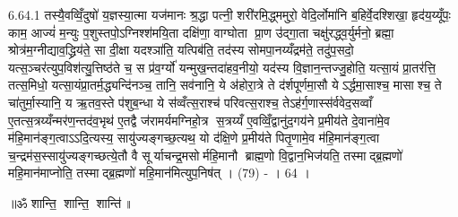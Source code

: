6.64.1
तस्यै॒वव्विँ॒दुषो॑ य॒ज्ञस्या॒त्मा यज॑मानः श्र॒द्धा पत्नी॒ शरी॑रमि॒द्ध्ममुरो॒ वेदि॒र्लोमा॑नि ब॒\ar{}हिर्वे॒दश्शिखा॒ हृद॑य॒य्यूँपः॒ काम॒ आज्यं॑ म॒न्युः प॒शुस्तपो॒ऽग्निश्श॑मयि॒ता दक्षि॑णा॒ वाग्घोता प्रा॒ण उ॑द्गा॒ता चक्षु॑रद्ध्व॒र्युर्मनो॒ ब्रह्मा॒ श्रोत्र॑म॒ग्नीद्याव॒द्ध्रिय॑ते॒ सा दी॒क्षा यदश्ञा॑ति॒ यत्पिब॑ति॒ तद॑स्य सोमपा॒नय्यँद्रम॑ते॒ तदु॑प॒सदो॒ यत्स॒ञ्चर॑त्युप॒विश॑त्यु॒त्तिष्ठ॑ते च॒ स प्र॑व॒र्ग्यो॑ यन्मुख॒न्तदा॑हव॒नीयो॒ यद॑स्य वि॒ज्ञान॒न्तज्जु॒होति॒ यत्सा॒यं प्रा॒तर॑त्ति॒ तत्स॒मिधो॒ यत्सा॒यंप्रा॒तर्म॒द्ध्यन्दि॑नञ्च॒ तानि॒ सव॑नानि॒ ये अ॑होरा॒त्रे ते द॑र्\mbox{}शपूर्णमा॒सौ येऽर्द्धमा॒साश्च॒ मासाश्च॒ ते चा॑तुर्मा॒स्यानि॒ य ऋ॒तव॒स्ते प॑शुब॒न्धा ये स॑व्वँत्स॒राश्च॑ परिवत्स॒राश्च॒ तेऽह॑र्ग॒णास्स॑र्ववेद॒सव्वाँ ए॒तत्स॒त्रय्यँन्मर॑ण॒न्तद॑व॒भृथ॑ ए॒तद्वै ज॑रामर्यमग्निहो॒त्र स॒त्रय्यँ ए॒वव्विँ॒द्वानु॑द॒गय॑ने प्र॒मीय॑ते दे॒वाना॑मे॒व म॑हि॒मान॑ङ्ग॒त्वाऽऽदि॒त्यस्य॒ सायु॑ज्यङ्गच्छ॒त्यथ॒ यो द॑क्षि॒णे प्र॒मीय॑ते पितृ॒णामे॒व म॑हि॒मान॑ङ्ग॒त्वा च॒न्द्रम॑स॒स्सायु॑ज्यङ्गच्छत्ये॒तौ वै सूर्याचन्द्र॒मसोर्महि॒मानौ ब्राह्म॒णो वि॒द्वान॒भिज॑यति॒ तस्माद्ब्र॒ह्मणो॑ महि॒मान॑माप्नोति॒ तस्माद्ब्र॒ह्मणो॑ महि॒मान॑मित्युप॒निष॑त् । (79) - । 64 ।

\centerline{॥ॐ शान्ति॒ शान्ति॒ शान्ति॑॥}
